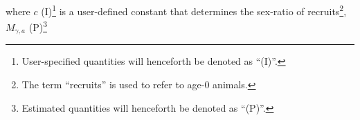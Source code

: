\documentclass[11pt,
  english,
  letterpaper,
]{article}
\begin{document}
where {\(c\)\leavevmode\tagmcend\tagstructend} (I){\footnote{

  User-specified quantities will henceforth be denoted as ``(I)''.

  \leavevmode\tagmcend\tagstructend\par}\leavevmode\tagmcend\tagstructend} is a user-defined constant that determines the sex-ratio of recruits{\footnote{

  The term ``recruits'' is used to refer to age-0 animals.

  \leavevmode\tagmcend\tagstructend\par}\leavevmode\tagmcend\tagstructend}, {\(M_{\gamma,a}\)\leavevmode\tagmcend\tagstructend} (P){\footnote{

  Estimated quantities will henceforth be denoted as ``(P)''.

}}
\end{document}
